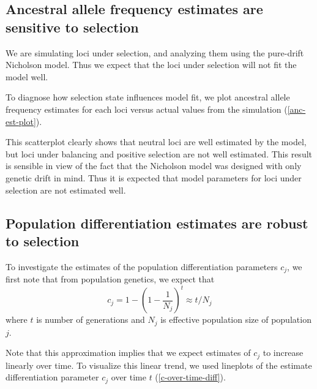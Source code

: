 \documentclass[a4paper,12pt]{article}
\begin{document}
\subsection{Ancestral allele frequency estimates are sensitive to selection}

We are simulating loci under selection, and analyzing them using the
pure-drift Nicholson model. Thus we expect that the loci under
selection will not fit the model well.

To diagnose how selection state influences model fit, we plot
ancestral allele frequency estimates for each loci versus actual
values from the simulation (\autoref{anc-est-plot}).


This scatterplot clearly shows that neutral loci are well estimated by
the model, but loci under balancing and positive selection are not
well estimated. This result is sensible in view of the fact that the
Nicholson model was designed with only genetic drift in mind. Thus it
is expected that model parameters for loci under selection are not
estimated well.

\subsection{Population differentiation estimates are robust to selection}

To investigate the estimates of the population differentiation
parameters $c_j$, we first note that from population genetics, we
expect that
\begin{equation}
  \label{c}
 c_j = 1 - (1 - \frac 1 {N_j})^t\approx t/N_j  
\end{equation}
where $t$ is number of generations and $N_j$ is effective population
size of population $j$.

Note that this approximation implies that we expect estimates of $c_j$
to increase linearly over time. To visualize this linear trend, we
used lineplots of the estimate differentiation parameter $c_j$ over
time $t$ (\autoref{c-over-time-diff}).

\end{document}
